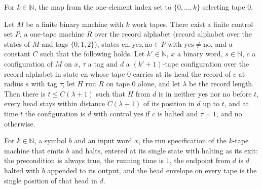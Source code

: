 \begin{definition}
\label{Complexity.sphRecordSel}
\leanok
For $k\in\mathbb{N}$, the map from the one-element index set to $\{0,\dots,k\}$ selecting tape $0$.
\end{definition}

\begin{lemma}
\label{Complexity.sph_test_run}
\leanok
{}
Let $M$ be a finite binary machine with $k$ work tapes. There exist a finite control set $P$, a
one-tape machine $R$ over the record alphabet (record alphabet over the states of $M$ and tags $\{0,1,2\}$), states
$\mathrm{en},\mathrm{yes},\mathrm{no}\in P$ with $\mathrm{yes}\ne\mathrm{no}$, and a constant $C$
such that the following holds. Let $k'\in\mathbb{N}$, $x$ a binary word, $s\in\mathbb{N}$, $c$ a
configuration of $M$ on $x$, $\tau$ a tag and $d$ a $(k'+1)$-tape configuration over the record
alphabet in state $\mathrm{en}$ whose tape $0$ carries at its head the record of $c$ at radius $s$
with tag $\tau$; let $H$ run $R$ on tape $0$ alone, and let $\lambda$ be the record length. Then
there is $t\le C(\lambda+1)$ such that $H$ from $d$ is in neither $\mathrm{yes}$ nor $\mathrm{no}$
before $t$, every head stays within distance $C(\lambda+1)$ of its position in $d$ up to $t$, and
at time $t$ the configuration is $d$ with control $\mathrm{yes}$ if $c$ is halted and $\tau=1$, and
$\mathrm{no}$ otherwise.
\end{lemma}

\begin{definition}
\label{Complexity.sphEmitContract}
\leanok
{}
For $k\in\mathbb{N}$, a symbol $b$ and an input word $x$, the run specification of the $k$-tape
machine that emits $b$ and halts, entered at its single state with halting as its exit: the
precondition is always true, the running time is $1$, the endpoint from $d$ is $d$ halted with $b$
appended to its output, and the head envelope on every tape is the single position of that head in
$d$.
\end{definition}

